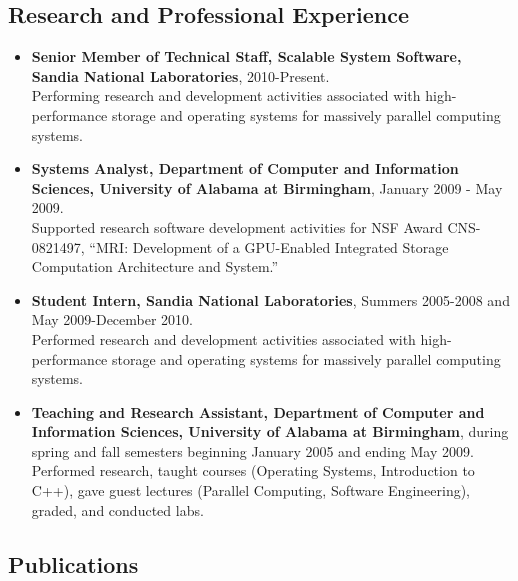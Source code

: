 \documentclass[11pt]{article}
\begin{document}
\subsection{Research and Professional Experience}
\begin{itemize}
\item {\bf Senior Member of Technical Staff, Scalable System Software,
  Sandia National Laboratories}, 2010-Present.\\ Performing research
  and development activities associated with high-performance storage
  and operating systems for massively parallel computing systems.
\item {\bf Systems Analyst, Department of Computer and Information
  Sciences, University of Alabama at Birmingham}, January 2009 - May
  2009.\\ Supported research software development activities for NSF
  Award CNS-0821497, ``MRI: Development of a GPU-Enabled Integrated
  Storage Computation Architecture and System.''
\item {\bf Student Intern, Sandia National Laboratories}, Summers
  2005-2008 and May 2009-December 2010.\\ Performed research and
  development activities associated with high-performance storage and
  operating systems for massively parallel computing systems.
\item {\bf Teaching and Research Assistant, Department of Computer and
  Information Sciences, University of Alabama at Birmingham}, during
  spring and fall semesters beginning January 2005 and ending May
  2009.\\ Performed research, taught courses (Operating Systems,
  Introduction to C++), gave guest lectures (Parallel Computing,
  Software Engineering), graded, and conducted labs.
\end{itemize}

\subsection{Publications}
\end{document}
